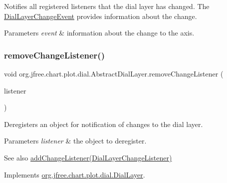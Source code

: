 Notifies all registered listeners that the dial layer has changed. The \mbox{\hyperlink{classorg_1_1jfree_1_1chart_1_1plot_1_1dial_1_1_dial_layer_change_event}{Dial\+Layer\+Change\+Event}} provides information about the change.


\begin{DoxyParams}{Parameters}
{\em event} & information about the change to the axis. \\
\hline
\end{DoxyParams}
\mbox{\label{classorg_1_1jfree_1_1chart_1_1plot_1_1dial_1_1_abstract_dial_layer_a584dfebd9266b2be68b75916812a3b8f}} 
\subsubsection{\texorpdfstring{remove\+Change\+Listener()}{removeChangeListener()}}
{\footnotesize\ttfamily void org.\+jfree.\+chart.\+plot.\+dial.\+Abstract\+Dial\+Layer.\+remove\+Change\+Listener (\begin{DoxyParamCaption}\item[{\mbox{\hyperlink{interfaceorg_1_1jfree_1_1chart_1_1plot_1_1dial_1_1_dial_layer_change_listener}{Dial\+Layer\+Change\+Listener}}}]{listener }\end{DoxyParamCaption})}

Deregisters an object for notification of changes to the dial layer.


\begin{DoxyParams}{Parameters}
{\em listener} & the object to deregister.\\
\hline
\end{DoxyParams}
\begin{DoxySeeAlso}{See also}
\mbox{\hyperlink{classorg_1_1jfree_1_1chart_1_1plot_1_1dial_1_1_abstract_dial_layer_ac0d049259317ed60eff0d0c38ecd1f34}{add\+Change\+Listener(\+Dial\+Layer\+Change\+Listener)}} 
\end{DoxySeeAlso}


Implements \mbox{\hyperlink{interfaceorg_1_1jfree_1_1chart_1_1plot_1_1dial_1_1_dial_layer_a8c8d3fc6fc08c79c96bd216e9af5a28a}{org.\+jfree.\+chart.\+plot.\+dial.\+Dial\+Layer}}.

